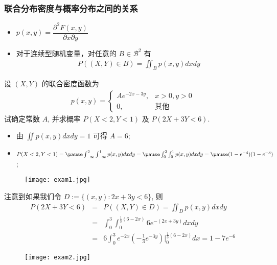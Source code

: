 \begin{frame}
  \frametitle{联合分布密度与概率分布之间的关系}

  \begin{itemize}[<+-|alert@+>]
  \item $p(x,y)=\dfrac{\partial^2F(x,y)}{\partial x\partial y}$
  \item 对于连续型随机变量，对任意的 $B\in \mathcal{B}^2$ 有
    \begin{eqnarray*}
      P((X,Y)\in B)=\iint_Bp(x,y)dxdy
    \end{eqnarray*}

  \end{itemize}

\end{frame}
\begin{frame}

  \begin{exam}
    设 $(X,Y)$ 的联合密度函数为
    \begin{eqnarray*}
      p(x,y)=\left\{
      \begin{array}{ll}
        Ae^{-2x-3y},& x>0,y>0\\
        0,&\mbox{其他}
      \end{array}\right.
    \end{eqnarray*}
    试确定常数 $A$, 并求概率 $P (X<2,Y<1)$ 及 $P (2X+3Y<6)$.
  \end{exam}

  \jieda
  \begin{itemize}[<+-|alert@+>]
  \item 由 $\iint p (x,y) dxdy=1$ 可得 $A=6$;
  \item $P(X<2,Y<1)=\pause \int_{-\infty}^2\int_{-\infty}^1p(x,y)dxdy=\pause \int_0^2\int_0^1p(x,y)dxdy=\pause (1-e^{-4})(1-e^{-3})$;
  \end{itemize}

  \begin{figure}[h]
    \centering
    \texttt{[image: exam1.jpg]}
  \end{figure}
\end{frame}
\begin{frame}
  \vspace{0.8cm}
  注意到如果我们令 $D:=\{(x,y):2x+3y< 6\}$, 则
  \begin{eqnarray*}
    P(2X+3Y<6)&=&P((X,Y)\in D)=\iint_D p(x,y)dxdy\\
              &=&\int_0^3\int_0^{\frac{1}{3}(6-2x)}6e^{-(2x+3y)}dxdy\\
              &=&6\int_0^3e^{-2x}(-\frac{1}{3}e^{-3y})|_0^{\frac{1}{3}(6-2x)}dx=1-7e^{-6}
  \end{eqnarray*}

  \begin{figure}[h]
    \centering
    \texttt{[image: exam2.jpg]}
  \end{figure}
\end{frame}

